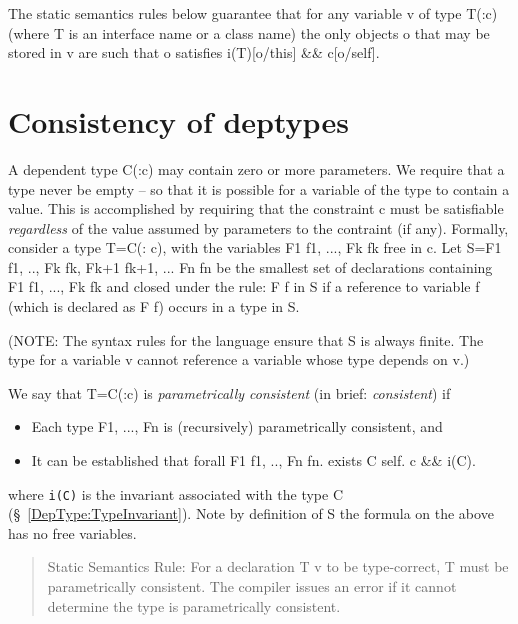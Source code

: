 The static semantics rules below guarantee that for any variable {\cf v} of
type {\cf T(:c)} (where {\cf T} is an interface name or a class name) the only
objects {\cf o} that may be stored in {\cf v} are such that {\cf o} satisfies
{\cf i(T)[o/this] \&\& c[o/self]}.

\section{Consistency of deptypes}\label{DepType:Consistency}

A dependent type {\cf C(:c)} may contain zero or more parameters. We require
that a type never be empty -- so that it is possible for a variable of
the type to contain a value. This is accomplished by requiring that
the constraint c must be satisfiable {\em regardless} of the value assumed
by parameters to the contraint (if any). Formally, consider a type
{\cf T=C(: c)}, with the variables {\cf F1 f1, ..., Fk fk} free in {\cf c}.  Let 
{\cf S={F1 f1, .., Fk fk, Fk+1 fk+1, ... Fn fn}} be the smallest set of
declarations containing {\cf F1 f1, ..., Fk fk} and closed under the rule: {\cf F
f} in {\cf S} if a reference to variable {\cf f} (which is declared as {\cf F f}) occurs
in a type in {\cf S}.

(NOTE: The syntax rules for the language ensure that {\cf S} is always
finite. The type for a variable {\cf v} cannot reference a variable whose
type depends on {\cf v}.)

We say that {\cf T=C(:c)} is {\em parametrically consistent} (in brief:
{\em consistent}) if

\begin{itemize}
  \item Each type {\cf F1, ..., Fn} is (recursively) parametrically consistent, and
\item It can be established that {\cf forall F1 f1, .., Fn fn. exists C self. c \&\& i(C)}.
\end{itemize}
\noindent where {\tt i(C)} is the invariant associated with the type {\cf C}
(\S~\ref{DepType:TypeInvariant}).  Note by definition of {\cf S} the formula on the
above has no free variables.

\begin{quotation}
   {\sc Static Semantics Rule:}
    For a declaration {\cf T v} to be type-correct, {\cf T} must be parametrically
    consistent. The compiler issues an error if it cannot determine
    the type is parametrically consistent.
\end{quotation}

